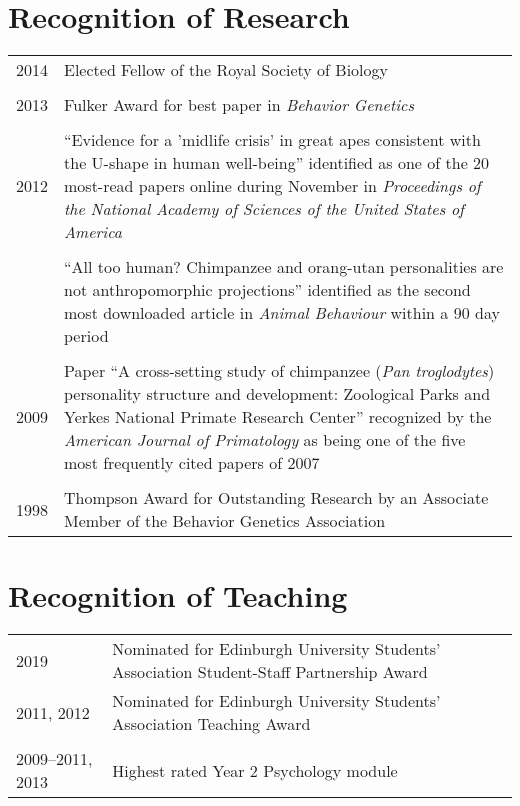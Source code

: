 \documentclass[11pt]{article}
\begin{document}
\section*{Recognition of Research}
\begin{tabular}{p{3cm}p{12cm}}
2014 & Elected Fellow of the Royal Society of Biology \\ \\

2013 & Fulker Award for best paper in \textit{Behavior Genetics} \\ \\

2012 & ``Evidence for a 'midlife crisis' in great apes consistent with
the U-shape in human well-being'' identified as one of the 20
most-read papers online during November in \textit{Proceedings of the National Academy of
Sciences of the United States of America} \\ \\

& ``All too human? Chimpanzee and orang-utan personalities are
not anthropomorphic projections'' identified as the second most
downloaded article in \textit{Animal Behaviour} within a 90 day period
\\ \\

2009 & Paper ``A cross-setting study of chimpanzee (\textit{Pan
troglodytes}) personality structure and development: Zoological
Parks and Yerkes National Primate Research Center'' recognized by the
\textit{American Journal of Primatology} as being one of the five most
frequently cited papers of 2007 \\ \\

1998 & Thompson Award for Outstanding
Research by an Associate Member of the Behavior Genetics Association
\end{tabular}

\section*{Recognition of Teaching}
\begin{tabular}{p{3cm}p{12cm}}
2019 & Nominated for Edinburgh University Students' Association
Student-Staff Partnership Award \\

2011, 2012 & Nominated for Edinburgh University Students' Association
Teaching Award \\ \\

2009--2011, 2013 & Highest rated Year 2 Psychology module 
\end{tabular}
\end{document}
